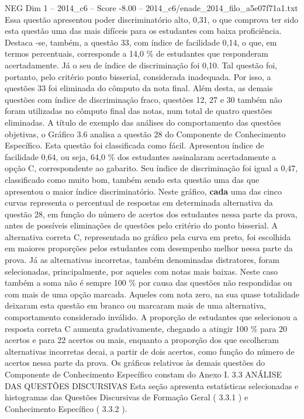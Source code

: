 \begin{textsample}{NEG Dim 1 – 2014\_c6 – Score -8.00 – 2014\_c6/enade\_2014\_filo\_a5e07f71a1.txt}
Essa questão apresentou poder discriminatório alto, 0,31, o que comprova ter sido esta questão uma das mais difíceis para os estudantes com baixa proficiência.
Destaca -se, também, a questão 33, com índice de facilidade 0,14, o que, em termos percentuais, corresponde a 14,0 \% de estudantes que responderam acertadamente.
Já o seu de índice de discriminação foi 0,10.
Tal questão foi, portanto, pelo critério ponto bisserial, considerada inadequada.
Por isso, a questões 33 foi eliminada do cômputo da nota final.
Além desta, as demais questões com índice de discriminação fraco, questões 12, 27 e 30 também não foram utilizadas no cômputo final das notas, num total de quatro questões eliminadas.
A título de exemplo das análises do comportamento das questões objetivas, o Gráfico 3.6 analisa a questão 28 do Componente de Conhecimento Específico.
Esta questão foi classificada como fácil.
Apresentou índice de facilidade 0,64, ou seja, 64,0 \% dos estudantes assinalaram acertadamente a opção C, correspondente ao gabarito.
Seu índice de discriminação foi igual a 0,47, classificado como muito bom, também sendo esta questão uma das que apresentou o maior índice discriminatório.
Neste gráfico, \textbf{cada} uma das cinco curvas representa o percentual de respostas em determinada alternativa da questão 28, em função do número de acertos dos estudantes nessa parte da prova, antes de possíveis eliminações de questões pelo critério do ponto bisserial.
A alternativa correta C, representada no gráfico pela curva em preto, foi escolhida em maiores proporções pelos estudantes com desempenho melhor nessa parte da prova.
Já as alternativas incorretas, também denominadas distratores, foram selecionadas, principalmente, por aqueles com notas mais baixas.
Neste caso também a soma não é sempre 100 \% por causa das questões não respondidas ou com mais de uma opção marcada.
Aqueles com nota zero, na sua quase totalidade deixaram esta questão em branco ou marcaram mais de uma alternativa, comportamento considerado inválido.
A proporção de estudantes que selecionou a resposta correta C aumenta gradativamente, chegando a atingir 100 \% para 20 acertos e para 22 acertos ou mais, enquanto a proporção dos que escolheram alternativas incorretas decai, a partir de dois acertos, como função do número de acertos nessa parte da prova.
Os gráficos relativos às demais questões do Componente de Conhecimento Específico constam do Anexo I. 3.3 ANÁLISE DAS QUESTÕES DISCURSIVAS Esta seção apresenta estatísticas selecionadas e histogramas das Questões Discursivas de Formação Geral ( 3.3.1 ) e Conhecimento Específico ( 3.3.2 ).

\end{textsample}
